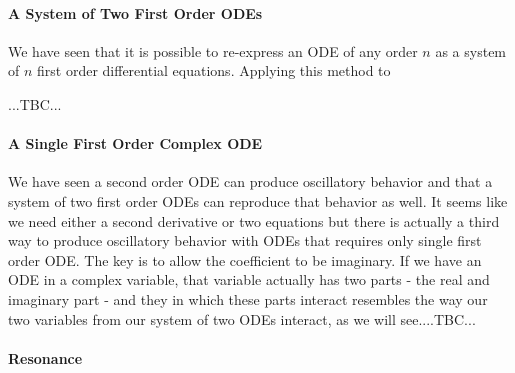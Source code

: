 

\paragraph{A System of Two First Order ODEs}
We have seen that it is possible to re-express an ODE of any order $n$ as a system of $n$ first order differential equations. Applying this method to 


...TBC...


\paragraph{A Single First Order Complex ODE}
We have seen a second order ODE can produce oscillatory behavior and that a system of two first order ODEs can reproduce that behavior as well. It seems like we need either a second derivative or two equations but there is actually a third way to produce oscillatory behavior with ODEs that requires only single first order ODE. The key is to allow the coefficient to be imaginary. If we have an ODE in a complex variable, that variable actually has two parts - the real and imaginary part - and they in which these parts interact resembles the way our two variables from our system of two ODEs interact, as we will see....TBC...






\paragraph{Resonance}

